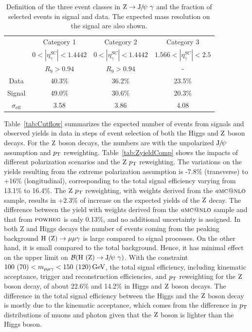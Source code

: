 		\begin{table}[!ht]
		\small
		\begin{center}
		\begin{tabular}{cccc}
		\hline
		           & Category 1  & Category 2 & Category 3\\
		           \cline{2-4}
		           & $0<|\eta_{\gamma}^{SC}|<1.4442$ & $0<|\eta_{\gamma}^{SC}|<1.4442$ & $1.566<|\eta_{\gamma}^{SC}|<2.5$ \\
		           & $R_{9} > 0.94$ & $R_{9} > 0.94$ & - \\
		           \hline
		Data & 40.3\% & 36.2\% & 23.5\% \\
		Signal & 49.0\% & 30.6\% & 20.3\% \\
		$\sigma_{\text{eff}}$&  3.58\GeV & 3.86\GeV & 4.08\GeV\\                                                                      
		\hline
		    \end{tabular}
		    \caption{Definition of the three event classes in $\mathrm{Z}\to{\mathrm{J}\hspace{-.08em}/\hspace{-.14em}\psi}\ \gamma$ and the fraction of selected events in signal and data. The expected mass resolution on the signal are also shown.\label{tab:2}}
		  \end{center}
		\end{table}
		
		Table~\ref{tab:Cutflow} summarizes the expected number of events from signals and observed yields in data in steps of event selection of both the Higgs and $\mathrm{Z}$ boson decays. For the $\mathrm{Z}$ boson decays, the numbers are with the unpolarized ${\mathrm{J}\hspace{-.08em}/\hspace{-.14em}\psi}$ assumption and $p_{\mathrm{T}}$ reweighting.
		Table~\ref{tab:ZyieldComp} shows the impacts of different polarization scenarios and the $\mathrm{Z}\ p_{\mathrm{T}}$ reweighting. The variations on the yields resulting from the extreme polarization assumption is -7.8$\%$ (transverse) to +16$\%$ (longitudinal), corresponding to the total signal efficiency varying from 13.1\% to 16.4\%.
	The $\mathrm{Z}\ p_{\mathrm{T}}$ reweighting, with weights derived from the $a\textsc{mc@nlo}$ sample, results in +2.3$\%$ of increase on the expected yields of the $\mathrm{Z}$ decay. The difference between the yield with weights derived from the $a\textsc{mc@nlo}$ sample and that from ${\textsc{powheg}}$ is only 0.13$\%$, and no additional uncertainty is assigned.
		In both Z and Higgs decays the number of events coming from the peaking background $\mathrm{H}\ (\mathrm{Z})\to\mu\mu\gamma$ is large compared to signal processes. On the other hand, it is small compared to the total background. Hence, it has minimal effect on the upper limit on $\mathcal{B}(\PH\ (\cPZ)\to\JPsi\ \gamma)$.
		With the constraint $100\ (70) < m_{\mu\mu\gamma} < 150\ (120)\GeV$, the total signal efficiency, including kinematic acceptance, trigger and reconstruction efficiencies, and $p_{\mathrm{T}}$ reweighting for the $\mathrm{Z}$ boson decay, of about 22.6\% and 14.2\% in Higgs and $\mathrm{Z}$ boson decays. 
		The difference in the total signal efficiency between the Higgs and the $\mathrm{Z}$ boson decay is mostly due to the kinematic acceptance, which comes from the difference in $p_{\mathrm{T}}$ distributions of muons and photon given that the $\mathrm{Z}$ boson is lighter than the Higgs boson.
		
